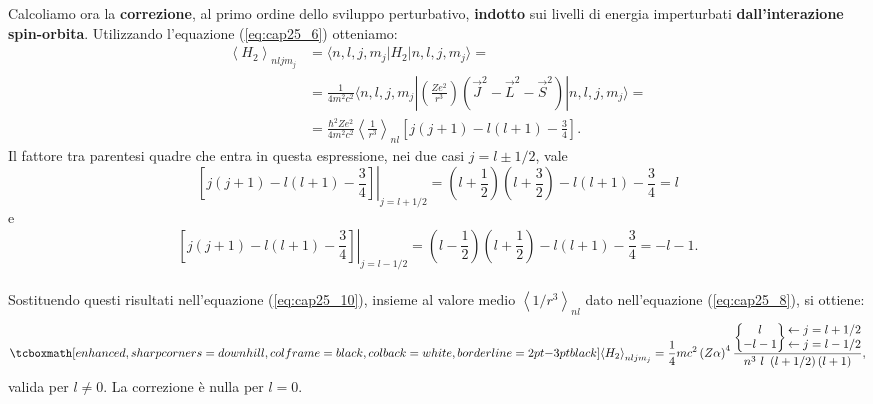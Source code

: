 Calcoliamo ora la \textbf{correzione}, al primo ordine dello sviluppo perturbativo, \textbf{indotto} sui livelli di energia imperturbati \textbf{dall'interazione spin-orbita}. Utilizzando l'equazione (\ref{eq:cap25_6}) otteniamo:
	\begin{align}
	\label{eq:cap25_10}
		\left< H_2 \right>_{nljm_j} &= \langle n,l,j,m_j | H_2 | n,l,j,m_j \rangle = \nonumber  \\
		& = \frac{1}{4m^2c^2} \langle n,l,j,m_j | \left( \frac{Ze^2}{r^3} \right) \left( \vec{J}^2-\vec{L}^2-\vec{S}^2 \right)      | n,l,j,m_j \rangle= \nonumber  \\
		& =  \frac{\hbar^2 Ze^2}{4m^2c^2} \left\langle \frac{1}{r^3} \right\rangle _{nl} \left[ j(j+1)-l(l+1)-\frac{3}{4}  \right] .
	\end{align}
Il fattore tra parentesi quadre che entra in questa espressione, nei due casi $j=l\pm1/2$, vale 
	\begin{equation}
		\left. \left[ j(j+1)-l(l+1)-\frac{3}{4}  \right]  \right|_{j=l+1/2}    = \left( l+\frac{1}{2} \right) \left( l+\frac{3}{2}\right)-l\left(l+1 \right) -\frac{3}{4}=l
	\end{equation}
e
	\begin{equation} 
		\left. \left[ j(j+1)-l(l+1)-\frac{3}{4}  \right] \right|_{j=l-1/2} = \left( l-\frac{1}{2} \right) \left(l+\frac{1}{2} \right)-l\left( l+1 \right) -\frac{3}{4}=-l-1 .
	\end{equation}\\
	
Sostituendo questi risultati nell'equazione (\ref{eq:cap25_10}), insieme al valore medio $\left< 1/r^3 \right>_{nl}$ dato nell'equazione (\ref{eq:cap25_8}), si ottiene:
	\begin{equation}
	\label{eq:cap25_11}
		\tcboxmath[enhanced, sharp corners=downhill, colframe=black, colback=white, borderline={2pt}{-3pt}{black}]{
		\left< H_2 \right>_{nljm_j}=\frac{1}{4}mc^2\left( Z\alpha \right)^4 \frac{\begin{Bmatrix}
		      l  \\ 
		      -l-1 
		    \end{Bmatrix}
		    \begin{matrix}
		    \leftarrow j=l+1/2 \\
		    \leftarrow j=l-1/2
		    \end{matrix} }{n^3 \ l \ \left(l+1/2 \right) \left( l+1 \right)} ,
		    }
\end{equation}
valida per $l\neq0$. La correzione è nulla per $l=0$. \\

